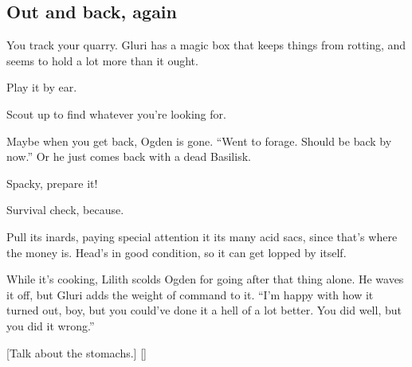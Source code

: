 \begin{multicols}{2}
  \subsection{Out and back, again}

  You track your quarry.
  Gluri has a magic box that keeps things from rotting, and seems to hold a lot more than it ought.

  Play it by ear.

  Scout up to find whatever you're looking for.

  Maybe when you get back, Ogden is gone.
  ``Went to forage.
    Should be back by now.''
  Or he just comes back with a dead Basilisk.

  Spacky, prepare it!

  Survival check, because.

  Pull its inards, paying special attention it its many acid sacs, since that's where the money is.
  Head's in good condition, so it can get lopped by itself.

  While it's cooking, Lilith scolds Ogden for going after that thing alone.
  He waves it off, but Gluri adds the weight of command to it.
  ``I'm happy with how it turned out, boy, but you could've done it a hell of a lot better.
    You did well, but you did it wrong.''

  [Talk about the stomachs.]
  []
  \end{multicols}
